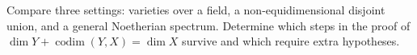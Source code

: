 \begin{problem}\label{chal:vi31-03}
Compare three settings: varieties over a field, a non-equidimensional disjoint union, and a general Noetherian spectrum. Determine which steps in the proof of $\dim Y+\operatorname{codim}(Y,X)=\dim X$ survive and which require extra hypotheses.
\end{problem}
